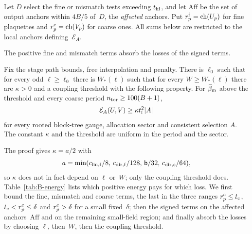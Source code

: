 Let $D$ select the fine or mismatch tests exceeding $t_{\rm hi}$, and let $\mathrm{Aff}$ be the set of output anchors within $4B/5$ of~$D$, the \emph{affected} anchors. Put $r^{\rm f}_p=\operatorname{ch}(U_p)$ for fine plaquettes and $r^{\rm c}_p=\operatorname{ch}(V_p)$ for coarse ones. All sums below are restricted to the local anchors defining~$\mathcal E_A$.

The positive fine and mismatch terms absorb the losses of the signed terms.
\begin{lemma}\label{lem:B-D1}
Fix the stage path bounds, free interpolation and penalty. There is $\ell_0$ such that for every odd $\ell\ge\ell_0$ there is $W_*(\ell)$ such that for every $W\ge W_*(\ell)$ there are $\kappa>0$ and a coupling threshold with the following property. For $\widehat{\beta}_m$ above the threshold and every coarse period $n_{\rm tor}\ge100(B+1)$,
\begin{equation*}
\mathcal E_A(U,V)\ge\kappa t_{\rm f}^2|A|
\end{equation*}
for every rooted block-tree gauge, allocation sector and consistent selection $A$. The constant $\kappa$ and the threshold are uniform in the period and the sector.
\end{lemma}
The proof gives $\kappa=a/2$ with
\begin{equation*}
a=\min(c_{{\rm lin},{\rm f}}/8,\,c_{{\rm dir},{\rm f}}/128,\,\mathsf{b}/32,\,c_{{\rm dir},{\rm c}}/64),
\end{equation*}
so $\kappa$ does not in fact depend on $\ell$ or~$W$; only the coupling threshold does. Table~\ref{tab:B-energy} lists which positive energy pays for which loss. We first bound the fine, mismatch and coarse terms, the last in the three ranges $r^{\rm c}_p\le t_{\rm c}$, $t_{\rm c}<r^{\rm c}_p\le\delta$ and $r^{\rm c}_p>\delta$ for a small fixed~$\delta$; then the signed terms on the affected anchors~$\mathrm{Aff}$ and on the remaining small-field region; and finally absorb the losses by choosing $\ell$, then~$W$, then the coupling threshold.

